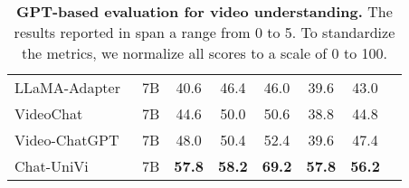 \documentclass[10pt,twocolumn,letterpaper]{article}
\begin{document}
\begin{table*}[t]
\begin{minipage}[b]{0.52\textwidth}
{\begin{tabular}{lccccccc}
 LLaMA-Adapter~\cite{zhang2023llama} & 7B & 40.6 & 46.4 & 46.0 & 39.6 & 43.0 \\
 VideoChat~\cite{li2023videochat} & 7B & 44.6 & 50.0 & 50.6 & 38.8 & 44.8 \\
 Video-ChatGPT~\cite{maaz2023video} & 7B & 48.0 & 50.4 & 52.4 & 39.6 & 47.4 \\ \midrule
 \rowcolor{aliceblue!60} Chat-UniVi & 7B & \bf{57.8} & \bf{58.2} & \bf{69.2} & \bf{57.8} & \bf{56.2} \\
\bottomrule[.9pt]
\end{tabular}
\vspace{-.6em}
\caption{\textbf{GPT-based evaluation for video understanding.} The results reported in \citet{maaz2023video} span a range from 0 to 5. To standardize the metrics, we normalize all scores to a scale of 0 to 100.}
\label{tab:gpt_video}
}
\end{minipage}
\hfill
\vspace{-.2em}
\end{table*}
\end{document}
